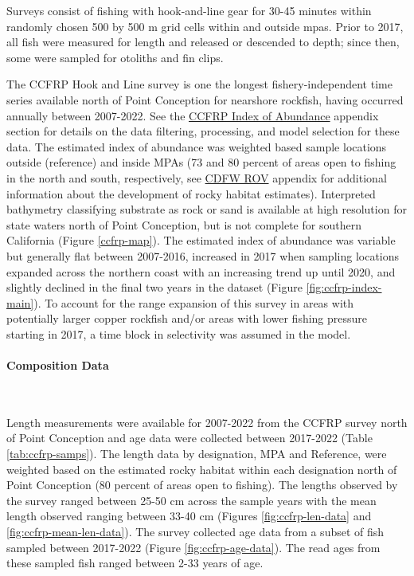 \documentclass[11pt,
  english,
  letterpaper,
]{article}
\begin{document}
Surveys consist of fishing with hook-and-line gear for 30-45 minutes within randomly chosen 500 by 500 m grid cells within and outside \glspl{mpa}. Prior to 2017, all fish were measured for length and released or descended to depth; since then, some were sampled for otoliths and fin clips.

The CCFRP Hook and Line survey is one the longest fishery-independent time series available north of Point Conception for nearshore rockfish, having occurred annually between 2007-2022. See the \protect\hyperlink{ccfrp-index}{CCFRP Index of Abundance} appendix section for details on the data filtering, processing, and model selection for these data. The estimated index of abundance was weighted based sample locations outside (reference) and inside MPAs (73 and 80 percent of areas open to fishing in the north and south, respectively, see \href{cdfw-rov-index}{CDFW ROV} appendix for additional information about the development of rocky habitat estimates). Interpreted bathymetry classifying substrate as rock or sand is available at high resolution for state waters north of Point Conception, but is not complete for southern California (Figure \ref{ccfrp-map}). The estimated index of abundance was variable but generally flat between 2007-2016, increased in 2017 when sampling locations expanded across the northern coast with an increasing trend up until 2020, and slightly declined in the final two years in the dataset (Figure \ref{fig:ccfrp-index-main}). To account for the range expansion of this survey in areas with potentially larger copper rockfish and/or areas with lower fishing pressure starting in 2017, a time block in selectivity was assumed in the model.

\hypertarget{composition-data-2}{%
\paragraph{Composition Data}\label{composition-data-2}}

~

Length measurements were available for 2007-2022 from the CCFRP survey north of Point Conception and age data were collected between 2017-2022 (Table \ref{tab:ccfrp-samps}). The length data by designation, MPA and Reference, were weighted based on the estimated rocky habitat within each designation north of Point Conception (80 percent of areas open to fishing). The lengths observed by the survey ranged between 25-50 cm across the sample years with the mean length observed ranging between 33-40 cm (Figures \ref{fig:ccfrp-len-data} and \ref{fig:ccfrp-mean-len-data}). The survey collected age data from a subset of fish sampled between 2017-2022 (Figure \ref{fig:ccfrp-age-data}). The read ages from these sampled fish ranged between 2-33 years of age.
\end{document}
